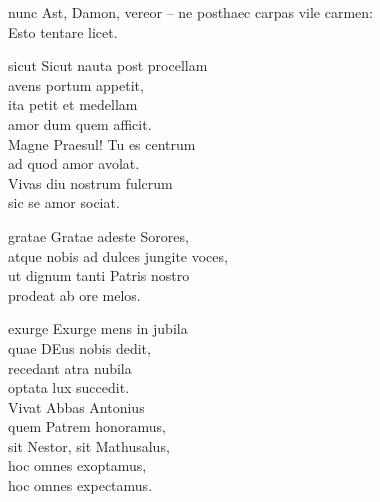 \documentclass[tocstyle=ref-genre]{ees}
\begin{document}
{\begin{movement}{nunc}
  \voice[Galathea]
  Ast, Damon, vereor – ne posthaec carpas vile carmen:\\
  Esto tentare licet.
\end{movement}
\clearpage
\begin{movement}{sicut}
  \voice[Galathea]
  Sicut nauta post procellam\\
  avens portum appetit,\\
  ita petit et medellam\\
  amor dum quem afficit.\\
  Magne Praesul! Tu es centrum\\
  ad quod amor avolat.\\
  Vivas diu nostrum fulcrum\\
  sic se amor sociat.
\end{movement}

\begin{movement}{gratae}
  \voice[Galathea]
  Gratae adeste Sorores,\\
  atque nobis ad dulces jungite voces,\\
  ut dignum tanti Patris nostro\\
  prodeat ab ore melos.
\end{movement}

\begin{movement}{exurge}
  \voice[Chorus]
  Exurge mens in jubila\\
  quae DEus nobis dedit,\\
  recedant atra nubila\\
  optata lux succedit.\\
  Vivat Abbas Antonius\\
  quem Patrem honoramus,\\
  sit Nestor, sit Mathusalus,\\
  hoc omnes exoptamus,\\
  hoc omnes expectamus.
\end{movement}
}

\eesScore
\end{document}

